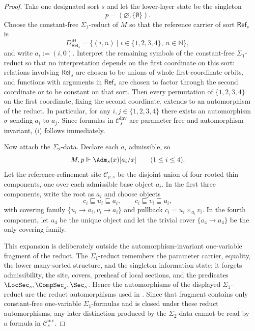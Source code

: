 \begin{proof}
Take one designated sort $s$ and let the lower-layer state be the singleton
\[
p=(\varnothing,\{\emptyset\}).
\]
Choose the constant-free $\Sigma_1$-reduct of $M$ so that the reference carrier of sort $\mathsf{Ref}_s$ is
\[
D_{\mathsf{Ref}_s}^M=\{(i,n)\mid i\in\{1,2,3,4\},\ n\in\mathbb N\},
\]
and write $a_i:=(i,0)$. Interpret the remaining symbols of the constant-free $\Sigma_1$-reduct so that no interpretation depends on the first coordinate on this sort: relations involving $\mathsf{Ref}_s$ are chosen to be unions of whole first-coordinate orbits, and functions with arguments in $\mathsf{Ref}_s$ are chosen to factor through the second coordinate or to be constant on that sort. Then every permutation of $\{1,2,3,4\}$ on the first coordinate, fixing the second coordinate, extends to an automorphism of the reduct. In particular, for any $i,j\in\{1,2,3,4\}$ there exists an automorphism $\sigma$ sending $a_i$ to $a_j$. Since formulas in $\mathcal{C}_{s}^{\mathrm{inv}}$ are parameter free and automorphism invariant, \textup{(i)} follows immediately.

Now attach the $\Sigma_2$-data. Declare each $a_i$ admissible, so
\[
M,p\Vdash \Adm_s(x)[a_i/x]
\qquad
(1\le i\le 4).
\]
Let the reference-refinement site $\mathcal C_{p,s}$ be the disjoint union of four rooted thin components, one over each admissible base object $a_i$. In the first three components, write the root as $a_i$ and choose objects
\[
c_i\sqsubseteq u_i\sqsubseteq a_i,
\qquad
c_i\sqsubseteq v_i\sqsubseteq a_i,
\]
with covering family $\{u_i\to a_i,v_i\to a_i\}$ and pullback $c_i=u_i\times_{a_i}v_i$. In the fourth component, let $a_4$ be the unique object and let the trivial cover $\{a_4\to a_4\}$ be the only covering family.

This expansion is deliberately outside the automorphism-invariant one-variable
fragment of the reduct. The $\Sigma_1$-reduct remembers the parameter carrier,
equality, the lower many-sorted structure, and the singleton information
state; it forgets admissibility, the site, covers, presheaf of local sections,
and the predicates $\LocSec_s,\CompSec_s,\Sec_s$. Hence the automorphisms of
the displayed $\Sigma_1$-reduct are the reduct automorphisms used in
. Since that fragment contains only
constant-free one-variable $\Sigma_1$-formulas and is closed under these
reduct automorphisms, any later distinction produced by the $\Sigma_2$-data
cannot be read by a formula in $\mathcal C_s^{\mathrm{inv}}$.


\end{proof}
